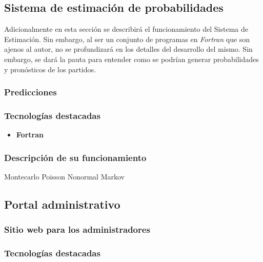 \subsection{Sistema de estimación de probabilidades}
Adicionalmente en esta sección se describirá el funcionamiento del Sistema de Estimación. Sin embargo, al ser un conjunto de programas en \emph{Fortran} que son ajenos al autor, no se profundizará en los detalles del desarrollo del mismo. Sin embargo, se dará la pauta para entender como se podrían generar probabilidades y pronósticos de los partidos.

\subsubsection{Predicciones}



\cite{rue2000prediction}

\cite{baio2010bayesian}

\cite{dixon2004value}

\cite{koopman2013dynamic}

 \subsubsection{Tecnologías destacadas}

\begin{itemize}
	\item \textbf{Fortran}
	\cite{robison1996c++}
	\cite{veldhuizen1997will}
\end{itemize}
	
\subsubsection{Descripción de su funcionamiento}

Montecarlo
Poisson
Nonormal
Markov


\subsection{Portal administrativo}

\subsubsection{Sitio web para los administradores}

 \cite{alfredo2005ingenieria}
 
 \subsubsection{Tecnologías destacadas}
 

